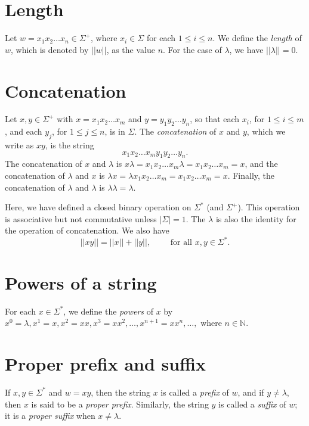 \documentclass[11pt]{article}
\begin{document}
    \section{Length}

    Let \(w = x_1 x_2 \dots x_n \in \Sigma^+\), where \(x_i \in \Sigma\) for each \(1 \leq i \leq n\). We define the \emph{length} of $w$, which is denoted by \(||w||\), as the value $n$. For the case of \(\lambda\), we have \(||\lambda|| = 0\).

    \section{Concatenation}

    Let \(x,y \in \Sigma^+\) with \(x = x_1 x_2 \dots x_m\) and \(y = y_1 y_2 \dots y_n\), so that each \(x_i\), for \( 1 \leq i \leq m \), and each \(y_j\), for \(1 \leq j \leq n\), is in \(\Sigma\). The \emph{concatenation} of $x$ and $y$, which we write as $xy$, is the string \[ x_1 x_2 \dots x_m y_1 y_2 \dots y_n. \] The concatenation of $x$ and $\lambda$ is \(x \lambda = x_1 x_2 \dots x_m \lambda = x_1 x_2 \dots x_m = x\), and the concatenation of $\lambda$ and $x$ is \(\lambda x = \lambda x_1 x_2 \dots x_m = x_1 x_2 \dots x_m = x.\) Finally, the concatenation of \( \lambda \) and \(\lambda\) is \(\lambda \lambda = \lambda.\)

    \vspace{1em}

    Here, we have defined a closed binary operation on \(\Sigma^*\) (and \(\Sigma^+\)). This operation is associative but not commutative unless \(|\Sigma| = 1\). The \(\lambda\) is also the identity for the operation of concatenation. We also have \[ ||xy|| = ||x|| + ||y||, \qquad \text{ for all }x,y \in \Sigma^*. \]

    \section{Powers of a string}

    For each \(x \in \Sigma^*\), we define the \emph{powers} of $x$ by \( x^0 = \lambda, x^1 = x, x^2 = xx, x^3 = xx^2, \dots, x^{n+1} = xx^n, \dots, \) where \( n \in \mathbb{N} \).

    \section{Proper prefix and suffix}

    If \(x,y \in \Sigma^*\) and \(w = xy\), then the string $x$ is called a \emph{prefix} of $w$, and if \(y \neq \lambda\), then $x$ is said to be a \emph{proper prefix}. Similarly, the string $y$ is called a \emph{suffix} of $w$; it is a \emph{proper suffix} when \(x \neq \lambda\).
\end{document}
